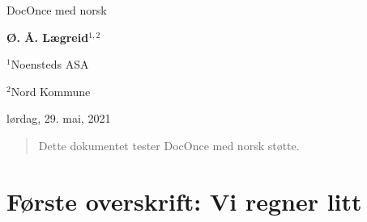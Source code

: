 \documentclass[%
norsk,oneside,                 %
final,                   %
10pt]{article}
\begin{document}

\newcommand{\exercisesection}[1]{\subsection*{#1}}








\thispagestyle{empty}

\begin{center}
{\LARGE\bf
\begin{spacing}{1.25}
DocOnce med norsk
\end{spacing}
}
\end{center}


\begin{center}
{\bf Ø. Å. Lægreid${}^{1, 2}$} \\ [0mm]
\end{center}

\begin{center}
\centerline{{\small ${}^1$Noensteds ASA}}
\centerline{{\small ${}^2$Nord Kommune}}
\end{center}
    

\begin{center}
lørdag, 29. mai, 2021
\end{center}

\vspace{1cm}



\begin{abstract}
Dette dokumentet tester DocOnce med norsk støtte.
\end{abstract}

\tableofcontents

\vspace{1cm} %

\section{Første overskrift: Vi regner litt}
\end{document}
